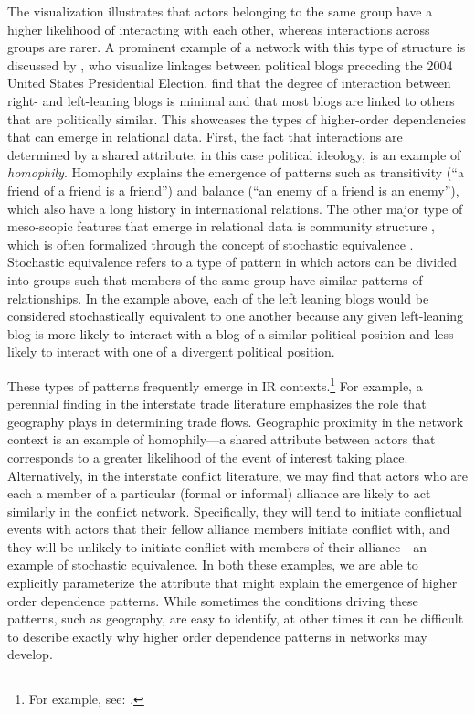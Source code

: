 The visualization illustrates that actors belonging to the same group have a higher likelihood of interacting with each other, whereas interactions across groups are rarer. A prominent example of a network with this type of structure is discussed by \citet{adamic:glance:2005}, who visualize linkages between political blogs preceding the 2004 United States Presidential Election. \citeauthor{adamic:glance:2005} find that the degree of interaction between right- and left-leaning blogs is minimal and that most blogs are linked to others that are politically similar. This showcases the types of higher-order dependencies that can emerge in relational data. First, the fact that interactions are determined by a shared attribute, in this case political ideology, is an example of \textit{homophily}. Homophily explains the emergence of patterns such as transitivity (``a friend of a friend is a friend'') and balance (``an enemy of a friend is an enemy''), which also have a long history in international relations. The other major type of meso-scopic features that emerge in relational data is community structure \citep{mucha:etal:2010}, which is often formalized through the concept of stochastic equivalence \citep{anderson:etal:1992}. Stochastic equivalence refers to a type of pattern in which actors can be divided into groups such that members of the same group have similar patterns of relationships. In the example above, each of the left leaning blogs would be considered stochastically equivalent to one another because any given left-leaning blog is more likely to interact with a blog of a similar political position and less likely to interact with one of a divergent political position.

These types of patterns frequently emerge in IR contexts.\footnote{For example, see: \citet{manger:etal:2012, kinne:2013, chyzh:2016}.} For example, a perennial finding in the interstate trade literature emphasizes the role that geography plays in determining trade flows. Geographic proximity in the network context is an example of homophily---a shared attribute between actors that corresponds to a greater likelihood of the event of interest taking place. Alternatively, in the interstate conflict literature, we may find that actors who are each a member of a particular (formal or informal) alliance are likely to act similarly in the conflict network. Specifically, they will tend to initiate conflictual events with actors that their fellow alliance members initiate conflict with, and they will be unlikely to initiate conflict with members of their alliance---an example of stochastic equivalence. In both these examples, we are able to explicitly parameterize the attribute that might explain the emergence of higher order dependence patterns. While sometimes the conditions driving these patterns, such as geography, are easy to identify, at other times it can be difficult to describe exactly why higher order dependence patterns in networks may develop.

